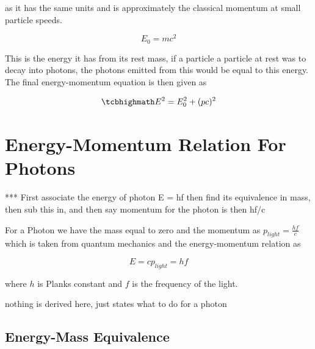 as it has the same units and is approximately the classical momentum at small particle speeds.

\begin{equation}
	E_0 = mc^2
\end{equation}

This is the energy it has from its rest mass, if a particle a particle at rest was to decay into photons, the photons emitted from this would be equal to this energy. The final energy-momentum equation is then given as

\begin{equation}
	\mhl{
		E^2 = E_0^2 + (pc)^2
	}
\end{equation}



\section{Energy-Momentum Relation For Photons}

*** First associate the energy of photon E = hf then find its equivalence in mass, then sub this in, and then say momentum for the photon is then hf/c

For a Photon we have the mass equal to zero and the momentum as $p_{light} = \frac{hf}{c}$ which is taken from quantum mechanics and the energy-momentum relation as

\begin{equation}
	E = c p_{light} = hf
\end{equation}

where $h$ is Planks constant and $f$ is the frequency of the light.

nothing is derived here, just states what to do for a photon

\subsection{Energy-Mass Equivalence}


